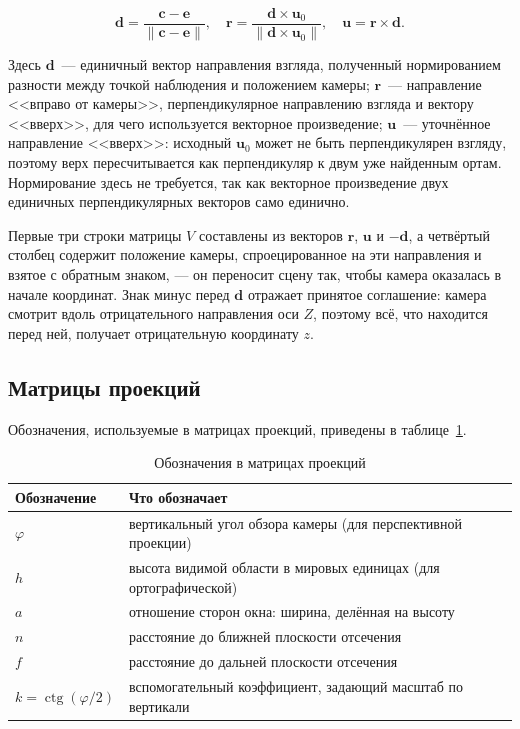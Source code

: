 \documentclass[14pt,a4paper]{extarticle}
\begin{document}
\begin{equation}
	\mathbf{d} = \frac{\mathbf{c} - \mathbf{e}}{\|\mathbf{c} - \mathbf{e}\|}, \quad
	\mathbf{r} = \frac{\mathbf{d} \times \mathbf{u}_0}{\|\mathbf{d} \times \mathbf{u}_0\|}, \quad
	\mathbf{u} = \mathbf{r} \times \mathbf{d}.
	\label{eq:basis}
\end{equation}

Здесь $\mathbf{d}$~— единичный вектор направления взгляда, полученный
нормированием разности между точкой наблюдения и положением камеры;
$\mathbf{r}$~— направление <<вправо от камеры>>, перпендикулярное направлению
взгляда и вектору <<вверх>>, для чего используется векторное произведение;
$\mathbf{u}$~— уточнённое направление <<вверх>>: исходный $\mathbf{u}_0$ может
не быть перпендикулярен взгляду, поэтому верх пересчитывается как перпендикуляр
к двум уже найденным ортам. Нормирование здесь не требуется, так как векторное
произведение двух единичных перпендикулярных векторов само единично.

Первые три строки матрицы $V$ составлены из векторов $\mathbf{r}$, $\mathbf{u}$
и $-\mathbf{d}$, а четвёртый столбец содержит положение камеры, спроецированное
на эти направления и взятое с обратным знаком, — он переносит сцену так, чтобы
камера оказалась в начале координат. Знак минус перед $\mathbf{d}$ отражает
принятое соглашение: камера смотрит вдоль отрицательного направления оси $Z$,
поэтому всё, что находится перед ней, получает отрицательную координату $z$.

\subsection{Матрицы проекций}

Обозначения, используемые в матрицах проекций, приведены в
таблице~\ref{tab:projnotation}.

\begin{table}[H]
	\caption{Обозначения в матрицах проекций}
	\label{tab:projnotation}
	\centering
	\vspace{2mm}
	\begin{tabular}{@{}l p{}@{}}
		\toprule
		Обозначение & Что обозначает \\
		\midrule
		$\varphi$ & вертикальный угол обзора камеры (для перспективной проекции) \\
		$h$ & высота видимой области в мировых единицах (для ортографической) \\
		$a$ & отношение сторон окна: ширина, делённая на высоту \\
		$n$ & расстояние до ближней плоскости отсечения \\
		$f$ & расстояние до дальней плоскости отсечения \\
		$k = \operatorname{ctg}(\varphi/2)$ & вспомогательный коэффициент, задающий масштаб по вертикали \\
		\bottomrule
	\end{tabular}
\end{table}
\end{document}
